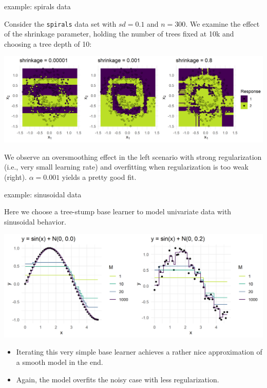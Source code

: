 \begin{vbframe}{example: spirals data}

Consider the \texttt{spirals} data set with $\mathit{sd} = 0.1$ and $n = 300$.
We examine the effect of the shrinkage parameter, holding the number of trees 
fixed at 10k and choosing a tree depth of 10:

\vfill

\includegraphics[width = \textwidth]{figure/gbm_regu_oversmoothing_overfitting}

\vfill

We observe an oversmoothing effect in the left scenario with strong 
regularization (i.e., very small learning rate) and overfitting when 
regularization is too weak (right). $\alpha = 0.001$  yields a pretty good fit.

\end{vbframe}


\begin{vbframe}{example: sinusoidal data}

Here we choose a tree-stump base learner to model univariate data 
with sinusoidal behavior.


\begin{center}
  \includegraphics[width=\textwidth]{figure/gbm_sine.png}
\end{center}


\small
\begin{itemize}
  \item Iterating this very simple base learner achieves a rather nice
  approximation of a smooth model in the end.
  \item Again, the model overfits the noisy case with less 
  regularization.
\end{itemize}

\end{vbframe}

\endlecture

